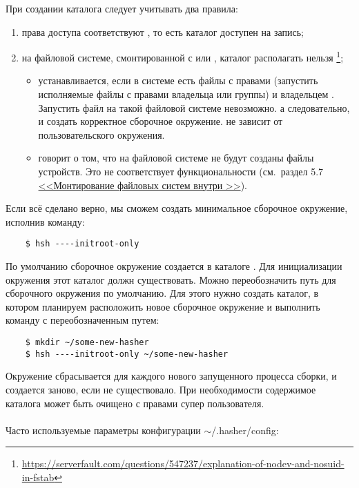 \begin{itemize}
	При создании каталога  следует учитывать два правила:
	\begin{enumerate}
		\item права доступа соответствуют , то есть каталог доступен на запись;
		\item на файловой системе, смонтированной с  или , каталог располагать нельзя%
		\footnote{\href{https://serverfault.com/questions/547237/explanation-of-nodev-and-nosuid-in-fstab}{https://serverfault.com/questions/547237/explanation-of-nodev-and-nosuid-in-fstab}};
		\begin{itemize}
			\item {} устанавливается, если в системе есть файлы с правами 
			(запустить исполняемые файлы с правами владельца или группы) и владельцем .
			Запустить файл  на такой файловой системе невозможно. а следовательно,
			и создать корректное сборочное окружение.  не зависит от пользовательского окружения.
			\item {} говорит о том, что на файловой системе не будут созданы файлы устройств.
			Это не соответствует функциональности  (см.~раздел 5.7
			\hyperlink{mount_fs_hasher}{<<Монтирование файловых систем внутри >>}).
		\end{itemize}
	\end{enumerate}
\end{itemize}
Если всё сделано верно, мы сможем создать минимальное сборочное окружение, исполнив команду:
\begin{verbatim}
	$ hsh ----initroot-only
\end{verbatim}
По умолчанию сборочное окружение создается в каталоге . Для инициализации окружения
этот каталог должн существовать. Можно переобозначить путь для сборочного окружения по умолчанию.
Для этого нужно создать каталог, в котором планируем расположить новое сборочное окружение и выполнить
команду с переобозначенным путем:
\begin{verbatim}
	$ mkdir ~/some-new-hasher
	$ hsh ----initroot-only ~/some-new-hasher
\end{verbatim}
Окружение сбрасывается для каждого нового запущенного процесса сборки, и создается заново, если
не существовало. При необходимости содержимое каталога может быть очищено с правами
супер пользователя.\\
\\
Часто используемые параметры конфигурации $\sim$/.hasher/config:
